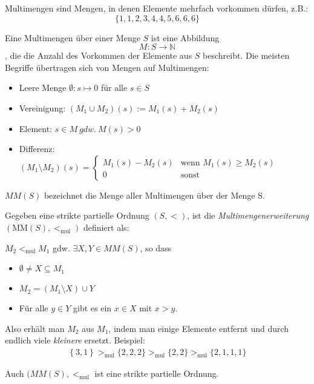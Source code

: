 Multimengen sind Mengen, in denen Elemente mehrfach vorkommen dürfen, z.B.:
$$\{1,1,2,3,4,4,5,6,6,6\}$$

Eine Multimengen über einer Menge $S$ ist eine Abbildung
$$M:S\rightarrow\mathbb{N}$$, die die Anzahl des Vorkommen der Elemente aus
$S$ beschreibt.  Die meisten Begriffe übertragen sich von Mengen auf
Multimengen:

\begin{itemize}
	\item Leere Menge $\emptyset: s \mapsto 0$ für alle $s \in S$
	\item Vereinigung: $(M_1 \cup M_2)(s) := M_1(s) + M_2(s)$ 
	\item Element: $s \in M\ gdw.\ M(s)>0$
    \item Differenz: $(M_1 \setminus M_2)(s) =
        \begin{cases}
                M_1(s) - M_2(s) & \text{wenn } M_1(s) \geq M_2(s)\\
                0 & \text{sonst}
        \end{cases}$
\end{itemize}

$MM(S)$ bezeichnet die Menge aller Multimengen über der Menge S.

Gegeben eine strikte partielle Ordnung $\left( S, < \right)$, ist die
\emph{Multimengenerweiterung} $\left( \text{MM}\left( S \right), <_{\text{mul}} \right)$ definiert als: 

$M_2 <_{\text{mul}}M_1$ gdw. $\exists X,Y \in MM(S)$, so dass

\begin{itemize}
\item
  $\emptyset \neq X \subseteq M_1$
\item
  $M_2 = \left( M_1 \setminus X \right) \cup Y$
\item
    Für alle $y \in Y$ gibt es ein $x \in X$ mit $x > y$.
\end{itemize}

Also erhält man $M_2$ aus $M_1$, indem man einige Elemente entfernt und durch endlich viele \emph{kleinere} ersetzt.
Beispiel:
\begin{align*}
\left\{ 3,1 \right\} >_{\text{mul}}\{ 2,2,2\} >_{\text{mul}}\{ 2,2\} >_{\text{mul}}\{ 2,1,1,1\}
\end{align*}

\setcounter{definition}{5}
\begin{lemma}
    Auch $(MM(S), <_{\text{mul}}$ ist eine strikte partielle Ordnung.
\end{lemma}

